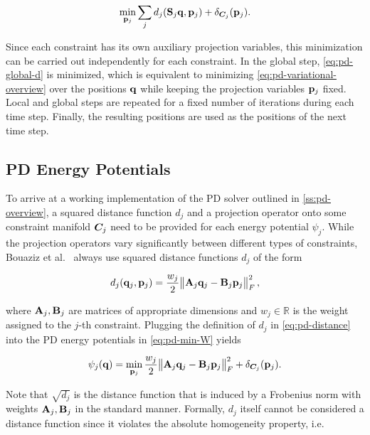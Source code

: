 \begin{equation}\label{eq:pd-local-d}
    \min_{\mathbf{p}_j} \sum_j d_j(\mathbf{S}_j \mathbf{q}, \mathbf{p}_j) + \delta_{\bm{C}_j}(\mathbf{p}_j).
\end{equation}

\noindent Since each constraint has its own auxiliary projection variables, this minimization can be carried out independently 
for each constraint. In the global step, \autoref{eq:pd-global-d} is minimized, which is equivalent to minimizing 
\autoref{eq:pd-variational-overview} over the positions $\mathbf{q}$ while keeping the projection variables $\mathbf{p}_j$ 
fixed. Local and global steps are repeated for a fixed number of iterations during each time step. Finally, the 
resulting positions are used as the positions of the next time step.

\subsection{PD Energy Potentials}\label{ss:pd-potentials}
To arrive at a working implementation of the PD solver outlined in \cref{ss:pd-overview}, a squared distance function 
$d_j$ and a projection operator onto some constraint manifold $\bm{C}_j$ need to be provided for each energy potential $\psi_j$. 
While the projection operators vary significantly between different types of constraints, Bouaziz et al.\ \cite{bouaziz2014} 
always use squared distance functions $d_j$ of the form

\begin{equation}\label{eq:pd-distance}
    d_j(\mathbf{q}_j, \mathbf{p}_j) = \frac{w_j}{2} \norm{\mathbf{A}_j\mathbf{q}_j - \mathbf{B}_j\mathbf{p}_j}^2_F,
\end{equation}

\noindent where $\mathbf{A}_j, \mathbf{B}_j$ are matrices of appropriate dimensions and $w_j \in \mathbb{R}$ is the weight assigned to the
$j$-th constraint. Plugging the definition of $d_j$ in \autoref{eq:pd-distance} into the PD energy potentials in \autoref{eq:pd-min-W} 
yields

\begin{equation}\label{eq:pd-potentials}
    \psi_j(\mathbf{q}) = \min_{\mathbf{p}_j} \frac{w_j}{2} \norm{\mathbf{A}_j\mathbf{q}_j - \mathbf{B}_j\mathbf{p}_j}^2_F + \delta_{\bm{C}_j}(\mathbf{p}_j).
\end{equation}

Note that $\sqrt{d_j}$ is the distance function that is induced by a Frobenius norm with weights $\mathbf{A}_j, 
\mathbf{B}_j$ in the standard manner. Formally, $d_j$ itself cannot be considered a distance function since it violates the absolute
homogeneity property, i.e. 

